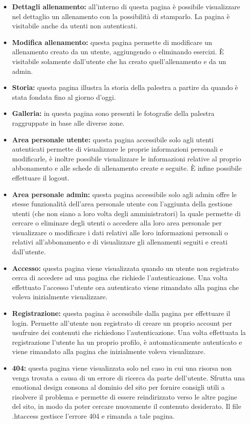 \documentclass[a4paper]{article}
\begin{document}
\begin{itemize}
		\item \textbf{Dettagli allenamento:} all'interno di questa pagina è possibile visualizzare nel dettaglio un allenamento con la possibilità di stamparlo. La pagina è visitabile anche da utenti non autenticati.
		\item \textbf{Modifica allenamento:} questa pagina permette di modificare un allenamento creato da un utente, aggiungendo o eliminando esercizi. È visitabile solamente dall'utente che ha creato quell'allenamento e da un admin.
		\item \textbf{Storia:} questa pagina illustra la storia della palestra a partire da quando è stata fondata fino al giorno d'oggi.
		\item \textbf{Galleria:} in questa pagina sono presenti le fotografie della palestra raggruppate in base alle diverse zone.
		\item \textbf{Area personale utente:} questa pagina accessibile solo agli utenti autenticati permette di visualizzare le proprie informazioni personali e modificarle, è inoltre possibile visualizzare le informazioni relative al proprio abbonamento e alle schede di allenamento create e seguite. È infine possibile effettuare il logout.
		\item \textbf{Area personale admin:} questa pagina accessibile solo agli admin offre le stesse funzionalità dell'area personale utente con l'aggiunta della gestione utenti (che non siano a loro volta degli amministratori) la quale permette di cercare o eliminare degli utenti o accedere alla loro area personale per visualizzare o modificare i dati relativi alle loro informazioni personali o relativi all'abbonamento e di visualizzare gli allenamenti seguiti e creati dall'utente.
		\item \textbf{Accesso:} questa pagina viene visualizzata quando un utente non registrato cerca di accedere ad una pagina che richiede l'autenticazione. Una volta effettuato l'accesso l'utente ora autenticato viene rimandato alla pagina che voleva inizialmente visualizzare.
		\item \textbf{Registrazione:} questa pagina è accessibile dalla pagina per effettuare il login. Permette all'utente non registrato di creare un proprio account per usufruire dei contenuti che richiedono l'autenticazione. Una volta effettuata la registrazione l'utente ha un proprio profilo, è automaticamente autenticato e viene rimandato alla pagina che inizialmente voleva visualizzare.
		\item \textbf{404:} questa pagina viene visualizzata solo nel caso in cui una risorsa non venga trovata a causa di un errore di ricerca da parte dell'utente. Sfrutta una emotional design consona al dominio del sito per fornire consigli utili a risolvere il problema e permette di essere reindirizzato verso le altre pagine del sito, in modo da poter cercare nuovamente il contenuto desiderato. Il file .htaccess gestisce l'errore 404 e rimanda a tale pagina.

\end{itemize}
\end{document}

